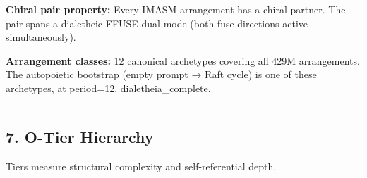 \textbf{Chiral pair property:} Every IMASM arrangement has a chiral
partner. The pair spans a dialetheic FFUSE dual mode (both fuse
directions active simultaneously).

\textbf{Arrangement classes:} 12 canonical archetypes covering all 429M
arrangements. The autopoietic bootstrap (empty prompt → Raft cycle) is
one of these archetypes, at period=12, dialetheia\_complete.

\begin{center}\rule{0.5\linewidth}{0.5pt}\end{center}

\hypertarget{o-tier-hierarchy}{%
\subsection{7. O-Tier Hierarchy}\label{o-tier-hierarchy}}

Tiers measure structural complexity and self-referential depth.

